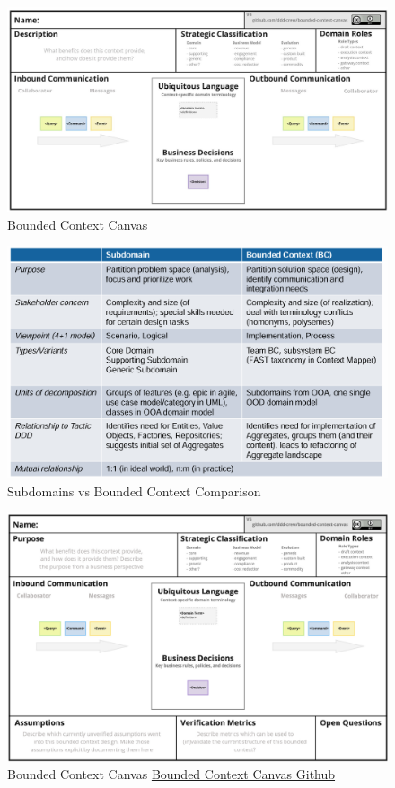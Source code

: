 \documentclass[../Main.tex]{subfiles}
\begin{document}
\begin{figure}[H]
    \centering
    \includegraphics[width=1\linewidth]{Images/bounded-context-canvas.png}
    \caption{Bounded Context Canvas}
\end{figure}

\begin{figure}[H]
    \centering
    \includegraphics[width=1\linewidth]{Images/subdomain-vs-bc.png}
    \caption{Subdomains vs Bounded Context Comparison}
\end{figure}

\begin{figure}[H]
    \centering
    \includegraphics[width=0.8\linewidth]{Images/bounded-context-canvas.jpg}
    \caption{Bounded Context Canvas \href{https://github.com/ddd-crew/bounded-context-canvas}{Bounded Context Canvas Github}}
\end{figure}
\end{document}
